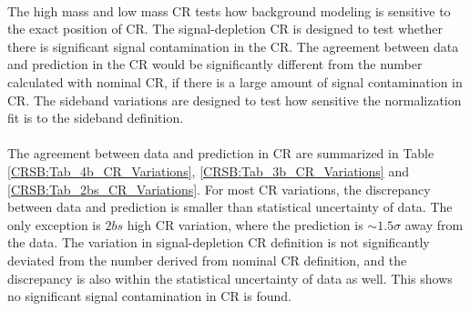 \paragraph{}
The high mass and low mass CR tests how background modeling is sensitive to the exact position of CR. 
The signal-depletion CR is designed to test whether there is significant signal contamination in the CR. 
The agreement between data and prediction in the CR would be significantly different from the number calculated with nominal CR, if there is a large amount of signal contamination in CR. 
The sideband variations are designed to test how sensitive the normalization fit is to the sideband definition.

\paragraph{}
The agreement between data and prediction in CR are summarized in Table \ref{CRSB:Tab_4b_CR_Variations}, \ref{CRSB:Tab_3b_CR_Variations} and \ref{CRSB:Tab_2bs_CR_Variations}.
For most CR variations, the discrepancy between data and prediction is smaller than statistical uncertainty of data. 
The only exception is $2bs$ high CR variation, where the prediction is $\sim 1.5 \sigma$ away from the data.
The variation in signal-depletion CR definition is not significantly deviated from the number derived from nominal CR definition, and the discrepancy is also within the statistical uncertainty of data as well.
This shows no significant signal contamination in CR is found.

